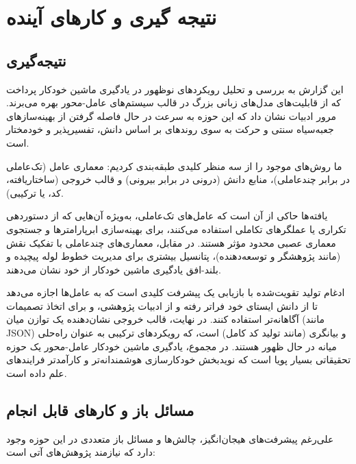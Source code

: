 
\chapter{نتیجه گیری و کارهای آینده}
\thispagestyle{empty}
\section{نتیجه‌گیری}
این گزارش به بررسی و تحلیل رویکردهای نوظهور در یادگیری ماشین خودکار پرداخت که از قابلیت‌های مدل‌های زبانی بزرگ در قالب سیستم‌های عامل-محور بهره می‌برند. مرور ادبیات نشان داد که این حوزه به سرعت در حال فاصله گرفتن از بهینه‌سازهای جعبه‌سیاه سنتی و حرکت به سوی روندهای بر اساس دانش، تفسیرپذیر و خودمختار است.

ما روش‌های موجود را از سه منظر کلیدی طبقه‌بندی کردیم: معماری عامل (تک‌عاملی در برابر چندعاملی)، منابع دانش (درونی در برابر بیرونی) و قالب خروجی (ساختاریافته، کد، یا ترکیبی).

یافته‌ها حاکی از آن است که عامل‌های تک‌عاملی، به‌ویژه آن‌هایی که از دستوردهی تکراری یا عملگرهای تکاملی استفاده می‌کنند، برای بهینه‌سازی ابرپارامترها و جستجوی معماری عصبی محدود مؤثر هستند. در مقابل، معماری‌های چندعاملی با تفکیک نقش (مانند پژوهشگر و توسعه‌دهنده)، پتانسیل بیشتری برای مدیریت خطوط لوله پیچیده و بلند-افق یادگیری ماشین خودکار از خود نشان می‌دهند.

ادغام تولید تقویت‌شده با بازیابی یک پیشرفت کلیدی است که به عامل‌ها اجازه می‌دهد تا از دانش ایستای خود فراتر رفته و از ادبیات پژوهشی،  و  برای اتخاذ تصمیمات آگاهانه‌تر استفاده کنند. در نهایت، قالب خروجی نشان‌دهنده یک توازن میان  (مانند JSON) و بیانگری (مانند تولید کد کامل) است، که رویکردهای ترکیبی به عنوان راه‌حلی میانه در حال ظهور هستند. در مجموع، یادگیری ماشین خودکار عامل-محور یک حوزه تحقیقاتی بسیار پویا است که نویدبخش خودکارسازی هوشمندانه‌تر و کارآمدتر فرایندهای علم داده است.

\section{مسائل باز و کارهای قابل انجام}
علی‌رغم پیشرفت‌های هیجان‌انگیز، چالش‌ها و مسائل باز متعددی در این حوزه وجود دارد که نیازمند پژوهش‌های آتی است:

